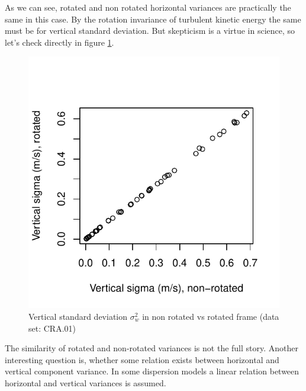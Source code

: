 \documentclass[a4paper,10pt]{book}
\begin{document}
As we can see, rotated and non rotated horizontal variances are practically the same in this case. By the rotation invariance of turbulent kinetic energy the same must be for vertical standard deviation. But skepticism is a virtue in science, so let's check directly in figure \ref{fig:Sigma_w}.

\begin{figure}[htp]
 \centering
 \begin{center}
 \includegraphics[scale=1.1,keepaspectratio=true]{./diagrams/sigma_w.pdf}
 \end{center}
 \caption{Vertical standard deviation $\sigma_{w}^{2}$ in non rotated vs rotated frame (data set: CRA.01)}
 \label{fig:Sigma_w}
\end{figure}

The similarity of rotated and non-rotated variances is not the full story. Another interesting question is, whether some relation exists between horizontal and vertical component variance. In some dispersion models a linear relation between horizontal and vertical variances is assumed.
\end{document}
